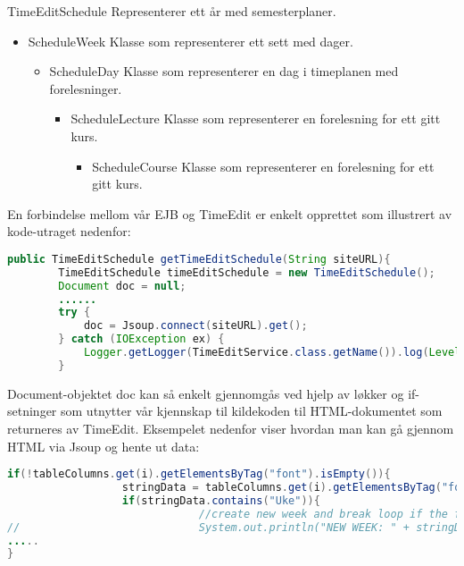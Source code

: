 \documentclass[../main.tex]{subfiles}
\begin{document}
TimeEditSchedule \newline Representerer ett år med semesterplaner.
\begin{itemize}
\item ScheduleWeek \newline Klasse som representerer ett sett med dager.
\begin{itemize}
\item ScheduleDay \newline Klasse som representerer en dag i timeplanen med forelesninger.
\begin{itemize}
\item ScheduleLecture \newline Klasse som representerer en forelesning for ett gitt kurs.
\begin{itemize}
\item ScheduleCourse \newline Klasse som representerer en forelesning for ett gitt kurs.
\end{itemize}
\end{itemize}
\end{itemize}
\end{itemize}

En forbindelse mellom vår EJB og TimeEdit er enkelt opprettet som illustrert av kode-utraget nedenfor:

\begin{lstlisting}[language=Java, frame=single, caption={Et utdrag av en metode i TimeEditService som viser hvordan Jsoup benyttes for å hente ut ett enkelt dokument}]
public TimeEditSchedule getTimeEditSchedule(String siteURL){      
        TimeEditSchedule timeEditSchedule = new TimeEditSchedule();
        Document doc = null;
        ......
        try {
            doc = Jsoup.connect(siteURL).get();
        } catch (IOException ex) {
            Logger.getLogger(TimeEditService.class.getName()).log(Level.SEVERE, null, ex);
        }      
\end{lstlisting}

Document-objektet doc kan så enkelt gjennomgås ved hjelp av løkker og if-setninger som utnytter vår kjennskap til kildekoden til HTML-dokumentet som returneres av TimeEdit. Eksempelet nedenfor viser hvordan man kan gå gjennom HTML via Jsoup og hente ut data:

\begin{lstlisting}[language=Java, frame=single, caption={asdasdsadasdasdasdsadsadasdasdsadsa}]
if(!tableColumns.get(i).getElementsByTag("font").isEmpty()){
                  stringData = tableColumns.get(i).getElementsByTag("font").first().text();
                  if(stringData.contains("Uke")){
                              //create new week and break loop if the first element contains Uke
//                            System.out.println("NEW WEEK: " + stringData);
.....
}
\end{lstlisting}
\end{document}
